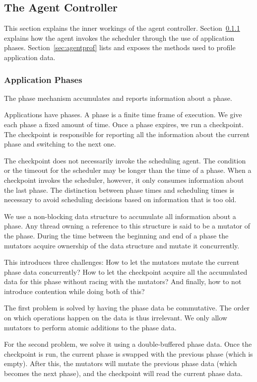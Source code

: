 \subsection{The Agent Controller}

This section explains the inner workings of the agent controller. Section~\ref{sec:agentphases} explains how the agent invokes the scheduler through the use of application phases. Section~\ref{sec:agentprof} lists and exposes the methods used to profile application data.

\subsubsection{Application Phases} \label{sec:agentphases}

The phase mechanism accumulates and reports information about a phase.

Applications have phases. A phase is a finite time frame of execution. We give each phase a fixed amount of time. Once a phase expires, we run a checkpoint. The checkpoint is responsible for reporting all the information about the current phase and switching to the next one.

The checkpoint does not necessarily invoke the scheduling agent. The condition or the timeout for the scheduler may be longer than the time of a phase. When a checkpoint invokes the scheduler, however, it only consumes information about the last phase. The distinction between phase times and scheduling times is necessary to avoid scheduling decisions based on information that is too old.

We use a non-blocking data structure to accumulate all information about a phase. Any thread owning a reference to this structure is said to be a mutator of the phase. During the time between the beginning and end of a phase the mutators acquire ownership of the data structure and mutate it concurrently.

This introduces three challenges: How to let the mutators mutate the current phase data concurrently? How to let the checkpoint acquire all the accumulated data for this phase without racing with the mutators? And finally, how to not introduce contention while doing both of this?

The first problem is solved by having the phase data be commutative. The order on which operations happen on the data is thus irrelevant. We only allow mutators to perform atomic additions to the phase data.

For the second problem, we solve it using a double-buffered phase data. Once the checkpoint is run, the current phase is swapped with the previous phase (which is empty). After this, the mutators will mutate the previous phase data (which becomes the next phase), and the checkpoint will read the current phase data.

